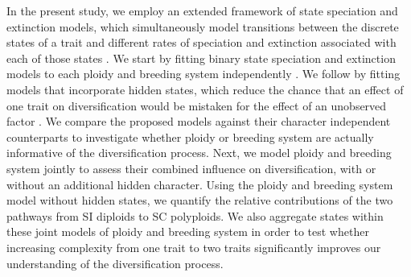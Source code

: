 In the present study, we employ an extended framework of state speciation and extinction models, which simultaneously model transitions between the discrete states of a trait and different rates of speciation and extinction associated with each of those states \citep[`SSE' models;][]{maddison_2007, fitzjohn_2012}.
We start by fitting binary state speciation and extinction models to each ploidy and breeding system independently \citep{maddison_2007}.
We follow by fitting models that incorporate hidden states, which reduce the chance that an effect of one trait on diversification would be mistaken for the effect of an unobserved factor \citep{beaulieu_2016}.
We compare the proposed models against their character independent counterparts \citep{beaulieu_2016} to investigate whether ploidy or breeding system are actually informative of the diversification process.
Next, we model ploidy and breeding system jointly to assess their combined influence on diversification, with or without an additional hidden character.
Using the ploidy and breeding system model without hidden states, we quantify the relative contributions of the two pathways from SI diploids to SC polyploids.
We also aggregate  states within these joint models of ploidy and breeding system in order to test whether increasing complexity from one trait to two traits significantly improves our understanding of the diversification process.
